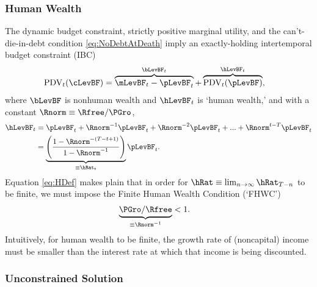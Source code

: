 \documentclass[./BufferStockTheory.tex]{subfiles}
\begin{document}
\subsubsection{Human Wealth}
The dynamic budget constraint, strictly positive marginal utility, and the can't-die-in-debt condition \eqref{eq:NoDebtAtDeath} imply an exactly-holding intertemporal budget constraint (IBC)
\begin{equation}\begin{gathered}\begin{aligned}
  \text{PDV}_{t}(\cLevBF)  & = \overbrace{\mLevBF_{t}-\pLevBF_{t}}^{\bLevBF_{t}}+\overbrace{\text{PDV}_{t}(\pLevBF)}^{\hLevBF_{t}}, \label{eq:IBCFinite}
\end{aligned}\end{gathered}\end{equation}
where $\bLevBF$ is nonhuman wealth and $\hLevBF_{t}$ is `human wealth,' and with a constant $\Rnorm \equiv \Rfree/\PGro$,
\begin{equation}\begin{gathered}\begin{aligned}
  \hLevBF_{t}  & = \pLevBF_{t}+\Rnorm^{-1} \pLevBF_{t} + \Rnorm^{-2} \pLevBF_{t} + ... + \Rnorm^{t-T} \pLevBF_{t} \notag
\\  & = \underbrace{\left(\frac{1-\Rnorm^{-(T-t+1)}}{1-\Rnorm^{-1}}\right)}_{\equiv \hRat_{t}}\pLevBF_{t} \label{eq:HDef}.
\end{aligned}\end{gathered}\end{equation}
Equation \eqref{eq:HDef} makes plain that in order for $\hRat \equiv \lim_{n \rightarrow
  \infty} \hRat_{T-n}$ to be finite, we must
impose the Finite Human Wealth Condition (`FHWC') \hypertarget{FHWC}{}
\begin{equation}\begin{gathered}\begin{aligned}
  \underbrace{\PGro/\Rfree}_{\equiv \Rnorm^{-1}}  & < 1 \label{eq:FHWC}.
\end{aligned}\end{gathered}\end{equation}
Intuitively, for human wealth to be finite, the growth rate of (noncapital) income must be smaller than
the interest rate at which that income is being discounted.

\hypertarget{Unconstrained-Solution}{}
\subsubsection{Unconstrained Solution} \label{subsec:PFUncon}
\end{document}
